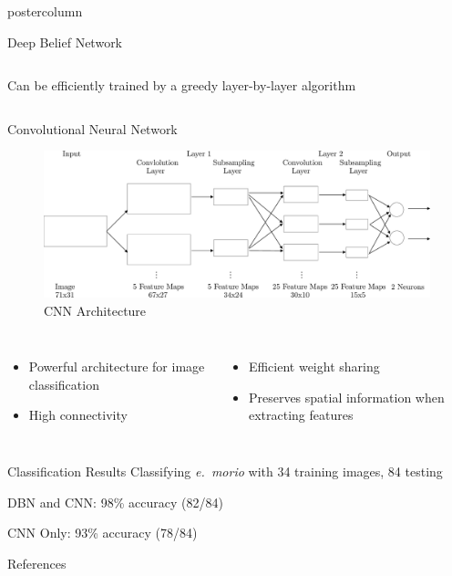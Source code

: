 \documentclass[final]{beamer}
\begin{document}
\begin{frame}
\begin{columns}
\begin{column}{.33\textwidth}
\begin{beamercolorbox}[center,wd=\textwidth]{postercolumn}
\begin{minipage}[T]{.95\textwidth}
{\begin{block}{Deep Belief Network}
\begin{columns}
\begin{itemize}
                      Can be efficiently trained by a greedy layer-by-layer
                      algorithm
                      \end{itemize}              
                \end{columns}
            \end{block}
            \vfill
            \begin{block}{Convolutional Neural Network}
            \begin{figure}[htbp]
               \centering
               \includegraphics[height=4\baselineskip]{cnnarch} %
               \caption{CNN Architecture}
            \end{figure}
            \begin{columns}
                \begin{itemize}
                \item Powerful architecture for image classification
                \item High connectivity
                \end{itemize}
                \begin{itemize}
                \item Efficient weight sharing
                \item Preserves spatial information when extracting features
                \end{itemize}
            \end{columns}
            \end{block}
            \vfill
            \begin{block}{Classification Results}
             Classifying {\it e.~morio} with 
             34 training images, 84 testing

             DBN and CNN: 98\% accuracy (82/84)

             CNN Only: 93\% accuracy (78/84)
            \end{block}
            \vfill
            \begin{block}{References}
              \nocite{Xiao:2008vn}
              \nocite{Tao:2008bh}
	    \nocite{Kittler:1986zr}
	    \nocite{Ila05}
             \def\newblock{}\small
	    
  	    
	    

\end{block}}
\end{minipage}
\end{beamercolorbox}
\end{column}
\end{columns}
\end{frame}
\end{document}
